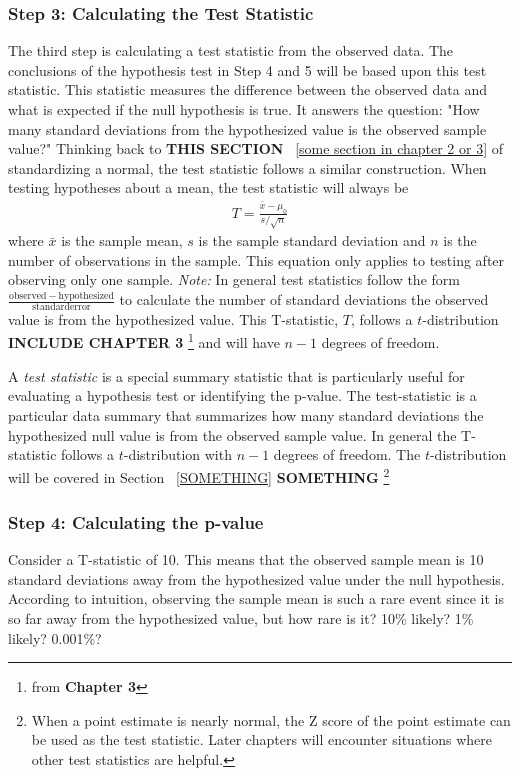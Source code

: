 \subsubsection{Step 3: Calculating the Test Statistic}
The third step is calculating a test statistic from the observed data. The conclusions of the hypothesis test in Step 4 and 5 will be based upon this test statistic. This statistic measures the difference between the observed data and what is expected if the null hypothesis is true. It answers the question: "How many standard deviations from the hypothesized value is the observed sample value?" Thinking back to \textbf{THIS SECTION} ~\ref{some section in chapter 2 or 3} of standardizing a normal, the test statistic follows a similar construction. When testing hypotheses about a mean, the test statistic will always be 
\begin{eqnarray}T=\frac{\bar{x}-\mu_0}{s/\sqrt{n}}\end{eqnarray} 
where $\bar{x}$ is the sample mean, $s$ is the sample standard deviation and $n$ is the number of observations in the sample. This equation only applies to testing after observing only one sample. 
\emph{Note:} In general test statistics follow the form $\frac{\mathrm{observed-hypothesized}}{\mathrm{standard error}}$ to calculate the number of standard deviations the observed value is from the hypothesized value. This T-statistic, $T$, follows a $t$-distribution \textbf{INCLUDE CHAPTER 3} \footnote{ from \textbf{Chapter 3}} and will have $n-1$ degrees of freedom. 

\begin{termBox}{
A \emph{test statistic} is a special summary statistic that is particularly useful for evaluating a hypothesis test or identifying the p-value. The test-statistic is a particular data summary that summarizes how many standard deviations the hypothesized null value is from the observed sample value. In general the T-statistic follows a $t$-distribution with $n-1$ degrees of freedom. The $t$-distribution will be covered in Section ~\ref{SOMETHING} \textbf{SOMETHING} \footnote{When a point estimate is nearly normal, the Z score of the point estimate can be used as the test statistic. Later chapters will encounter situations where other test statistics are helpful.}}
\end{termBox}

\subsubsection{Step 4: Calculating the p-value}
Consider a T-statistic of 10. This means that the observed sample mean is 10 standard deviations away from the hypothesized value under the null hypothesis. According to intuition, observing the sample mean is such a rare event since it is so far away from the hypothesized value, but how rare is it? 10\% likely? 1\% likely? 0.001\%?

